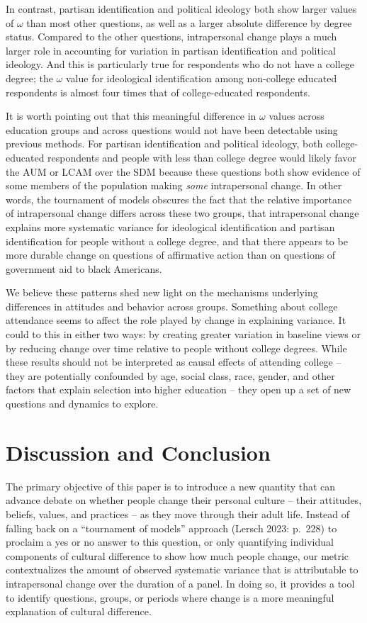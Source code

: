 \documentclass[
  12pt,
]{article}
\begin{document}
In contrast, partisan identification and political ideology both show
larger values of \(\omega\) than most other questions, as well as a
larger absolute difference by degree status. Compared to the other
questions, intrapersonal change plays a much larger role in accounting
for variation in partisan identification and political ideology. And
this is particularly true for respondents who do not have a college
degree; the \(\omega\) value for ideological identification among
non-college educated respondents is almost four times that of
college-educated respondents.

It is worth pointing out that this meaningful difference in \(\omega\)
values across education groups and across questions would not have been
detectable using previous methods. For partisan identification and
political ideology, both college-educated respondents and people with
less than college degree would likely favor the AUM or LCAM over the SDM
because these questions both show evidence of some members of the
population making \emph{some} intrapersonal change. In other words, the
tournament of models obscures the fact that the relative importance of
intrapersonal change differs across these two groups, that intrapersonal
change explains more systematic variance for ideological identification
and partisan identification for people without a college degree, and
that there appears to be more durable change on questions of affirmative
action than on questions of government aid to black Americans.

We believe these patterns shed new light on the mechanisms underlying
differences in attitudes and behavior across groups. Something about
college attendance seems to affect the role played by change in
explaining variance. It could to this in either two ways: by creating
greater variation in baseline views or by reducing change over time
relative to people without college degrees. While these results should
not be interpreted as causal effects of attending college -- they are
potentially confounded by age, social class, race, gender, and other
factors that explain selection into higher education -- they open up a
set of new questions and dynamics to explore.

\hypertarget{discussion-and-conclusion}{%
\section{Discussion and Conclusion}\label{discussion-and-conclusion}}

The primary objective of this paper is to introduce a new quantity that
can advance debate on whether people change their personal culture --
their attitudes, beliefs, values, and practices -- as they move through
their adult life. Instead of falling back on a ``tournament of models''
approach (Lersch 2023: p.~228) to proclaim a yes or no answer to this
question, or only quantifying individual components of cultural
difference to show how much people change, our metric contextualizes the
amount of observed systematic variance that is attributable to
intrapersonal change over the duration of a panel. In doing so, it
provides a tool to identify questions, groups, or periods where change
is a more meaningful explanation of cultural difference.
\end{document}
